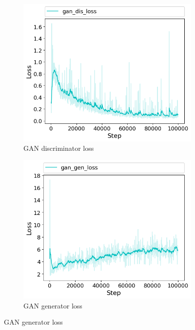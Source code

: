 \begin{figure}[h!]
  \begin{subfigure}[b]{0.5\textwidth}
    \includegraphics[width=\textwidth]{figures/ex/gan_dis_loss}
    \caption{GAN discriminator loss}
    \label{fig:gan_dis_loss}
  \end{subfigure}
  \hfill
  \begin{subfigure}[b]{0.5\textwidth}
    \includegraphics[width=\textwidth]{figures/ex/gan_gen_loss}
    \caption{GAN generator loss}
    \label{fig:gan_gen_loss}
  \end{subfigure}

\end{figure}
